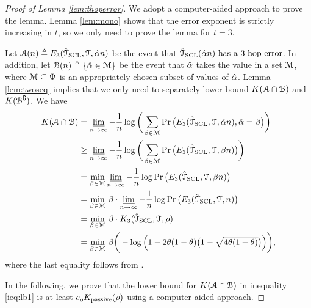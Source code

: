 \begin{proof}[Proof of Lemma \ref{lem:thoperror}]
	We adopt a computer-aided approach to prove the lemma. Lemma \ref{lem:mono} shows that the error exponent is strictly increasing in $t$, so we only need to prove the lemma for $t=3$. 
	
	Let $\mathcal{A}(n)\triangleq E_{3}(\hat{\mathcal{T}}_{{\rm SCL}},\mathcal{T},\hat{\alpha} n)$ be the event that $\hat{\mathcal{T}}_{\rm{SCL}}(\hat{\alpha} n)\text{ has a }3\text{-hop error}$. In addition,   let $\mathcal{B}(n)\triangleq\{\hat{\alpha} \in \mathcal{M}\}$ be the event that 
	$\hat{\alpha}$ takes the value in a set $\mathcal{M}$, where $\mathcal{M}\subseteq \Psi$ is an appropriately chosen subset of values of $\hat{\alpha}$. Lemma \ref{lem:twoseq} implies that we only need to separately lower bound $K(\mathcal{A}\cap \mathcal{B})$ and $K (\mathcal{B}^{\complement})$. We have
	\begin{align}
		K ( \mathcal{A}\cap \mathcal{B})&=\varliminf_{n\rightarrow\infty}-\frac{1}{n}\log \bigg(\sum_{\beta\in \mathcal{M}}\Pr\big(E_{3}(\hat{\mathcal{T}}_{{\rm SCL}},\mathcal{T},\hat{\alpha} n),\hat{\alpha}=\beta\big)\bigg)\\
		&\geq \varliminf_{n\rightarrow\infty}-\frac{1}{n}\log \bigg(\sum_{\beta\in \mathcal{M}}\Pr\big(E_{3}(\hat{\mathcal{T}}_{{\rm SCL}},\mathcal{T},\beta n)\big)\bigg)\\
		&=\min_{\beta\in \mathcal{M}}\varliminf_{n\rightarrow\infty}-\frac{1}{n}\log\Pr\big(E_{3}(\hat{\mathcal{T}}_{{\rm SCL}},\mathcal{T},\beta n)\big)\\
		&=\min_{\beta\in \mathcal{M}}\,\beta\cdot \varliminf_{n\rightarrow\infty}-\frac{1}{n}\log\Pr\big(E_{3}(\hat{\mathcal{T}}_{{\rm SCL}},\mathcal{T},n)\big)\\
		&=\min_{\beta\in \mathcal{M}}\,\beta \cdot K _{3}(\hat{\mathcal{T}}_{{\rm SCL}},\mathcal{T},\rho)\\
		&=\min_{\beta\in \mathcal{M}}\,\beta \bigg(-\log\Big(1-2\theta(1-\theta)\big(1-\sqrt{4\theta(1-\theta)}\big)\Big)\bigg), \label{ieq:lb1}
	\end{align}
	where the last equality follows from \cite[Lemma 1]{tandon2020exact}.

	In the following, we prove that the lower bound for $K ( \mathcal{A}\cap \mathcal{B})$ in inequality \eqref{ieq:lb1} is at least $c_{\rho}K _{{\rm passive}}(\rho)$ using a computer-aided approach.


\end{proof}
